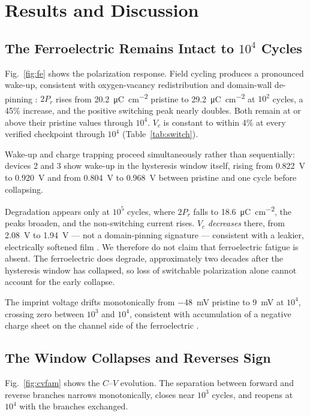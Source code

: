 \documentclass[journal]{IEEEtran}
\newcommand{\rev}[1]{{\color{blue}#1}}      %
\newcommand{\Prem}{P_r}
\newcommand{\Vc}{V_c}
\newcommand{\ucm}{\micro\coulomb\per\centi\meter\squared}
\begin{document}
\section{Results and Discussion}

\subsection{The Ferroelectric Remains Intact to $10^4$ Cycles}
Fig.~\ref{fig:fe} shows the polarization response. Field cycling
produces a pronounced wake-up, consistent with oxygen-vacancy
redistribution and domain-wall de-pinning
\cite{cho2024,Trapping_dynamic2}: $2\Prem$ rises from \SI{20.2}{\ucm}
pristine to \SI{29.2}{\ucm} at $10^2$ cycles, a 45\% increase, and the
positive switching peak nearly doubles. Both remain at or above their
pristine values through $10^4$. $\Vc$ is constant to within 4\% at every
verified checkpoint through $10^4$ (Table~\ref{tab:switch}).

\rev{Wake-up and charge trapping proceed simultaneously rather than
sequentially: devices 2 and 3 show wake-up in the hysteresis window
itself, rising from \SI{0.822}{\volt} to \SI{0.920}{\volt} and from
\SI{0.804}{\volt} to \SI{0.968}{\volt} between pristine and one cycle
before collapsing.}

Degradation appears only at $10^5$ cycles, where $2\Prem$ falls to
\SI{18.6}{\ucm}, the peaks broaden, and the non-switching current rises.
$\Vc$ \emph{decreases} there, from \SI{2.08}{\volt} to
\SI{1.94}{\volt} --- not a domain-pinning signature --- consistent with a
leakier, electrically softened film \cite{Poole_Frankel_2}.
\rev{We therefore do not claim that ferroelectric fatigue is absent. The
ferroelectric does degrade, approximately two decades after the
hysteresis window has collapsed, so loss of switchable polarization
alone cannot account for the early collapse.}

The imprint voltage drifts monotonically from \SI{-48}{\milli\volt}
pristine to \SI{+9}{\milli\volt} at $10^4$, crossing zero between $10^3$
and $10^4$, consistent with accumulation of a negative charge sheet on
the channel side of the ferroelectric \cite{imprint3}.

\subsection{The Window Collapses and Reverses Sign}
Fig.~\ref{fig:cvfam} shows the $C$--$V$ evolution. The separation
between forward and reverse branches narrows monotonically, closes near
$10^3$ cycles, and reopens at $10^4$ with the branches exchanged.
\end{document}
